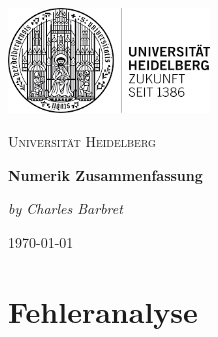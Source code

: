 \documentclass[12pt,a4paper]{article} %
\begin{document}
	\begin{titlepage} %
	\centering
	\includegraphics[width=0.40\textwidth]{UniLogo}\par\vspace{1cm}
		{\scshape\LARGE Universität Heidelberg \par}
		\vspace{1cm}
		{\huge\bfseries Numerik Zusammenfassung \par}
		\vspace{2cm}
		{\Large\itshape by Charles Barbret \par}
		
		\vfill

		{\large \gerDate\today\par}
	\end{titlepage}

	\tableofcontents %
	\newpage %
	
	
	\section{Fehleranalyse}
\end{document}
